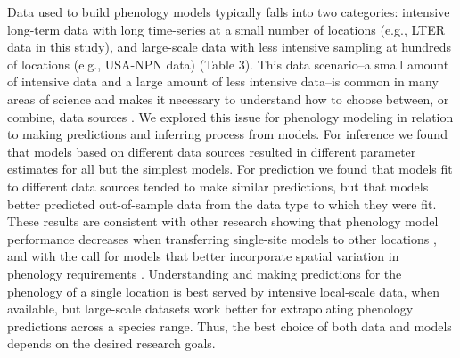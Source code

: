 \documentclass[fleqn,12pt,lineno]{article}
\begin{document}
Data used to build phenology models typically falls into two categories: intensive long-term data with long time-series at a small number of locations (e.g., LTER data in this study), and large-scale data with less intensive sampling at hundreds of locations (e.g., USA-NPN data) (Table 3). This data scenario--a small amount of intensive data and a large amount of less intensive data--is common in many areas of science and makes it necessary to understand how to choose between, or combine, data sources \citep{hanks2018}. We explored this issue for phenology modeling in relation to making predictions and inferring process from models. For inference we found that models based on different data sources resulted in different parameter estimates for all but the simplest models. For prediction we found that models fit to different data sources tended to make similar predictions, but that models better predicted out-of-sample data from the data type to which they were fit. These results are consistent with other research showing that phenology model performance decreases when transferring single-site models to other locations \citep{garcia-mozo2008, xu2013, basler2016}, and with the call for models that better incorporate spatial variation in phenology requirements \citep{richardson2013, chuine2017}. Understanding and making predictions for the phenology of a single location is best served by intensive local-scale data, when available, but large-scale datasets work better for extrapolating phenology predictions across a species range. Thus, the best choice of both data and models depends on the desired research goals.
\end{document}
